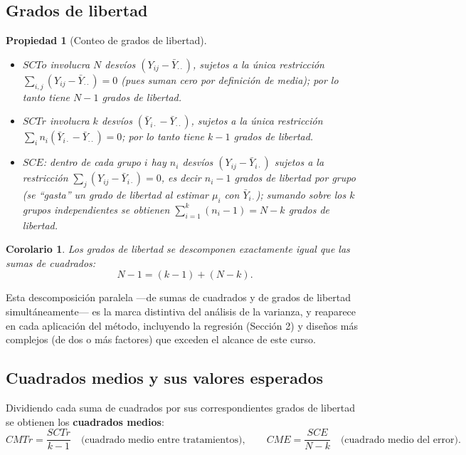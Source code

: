 \documentclass[11pt,a4paper]{article}
\theoremstyle{plain}
\newtheorem{propiedad}[teorema]{Propiedad}
\newtheorem{corolario}[teorema]{Corolario}
\theoremstyle{definition}
\theoremstyle{remark}
\begin{document}
\subsection{Grados de libertad}

\begin{propiedad}[Conteo de grados de libertad]
\begin{itemize}
\item $SCTo$ involucra $N$ desvíos $(Y_{ij}-\bar Y_{\cdot\cdot})$, sujetos a la única restricción $\sum_{i,j}(Y_{ij}-\bar Y_{\cdot\cdot})=0$ (pues suman cero por definición de media); por lo tanto tiene $N-1$ grados de libertad.
\item $SCTr$ involucra $k$ desvíos $(\bar Y_{i\cdot}-\bar Y_{\cdot\cdot})$, sujetos a la única restricción $\sum_in_i(\bar Y_{i\cdot}-\bar Y_{\cdot\cdot})=0$; por lo tanto tiene $k-1$ grados de libertad.
\item $SCE$: dentro de cada grupo $i$ hay $n_i$ desvíos $(Y_{ij}-\bar Y_{i\cdot})$ sujetos a la restricción $\sum_j(Y_{ij}-\bar Y_{i\cdot})=0$, es decir $n_i-1$ grados de libertad por grupo (se ``gasta'' un grado de libertad al estimar $\mu_i$ con $\bar Y_{i\cdot}$); sumando sobre los $k$ grupos independientes se obtienen $\sum_{i=1}^k(n_i-1)=N-k$ grados de libertad.
\end{itemize}
\end{propiedad}

\begin{corolario}
Los grados de libertad se descomponen exactamente igual que las sumas de cuadrados:
\[
N-1 = (k-1)+(N-k).
\]
\end{corolario}

Esta descomposición paralela —de sumas de cuadrados y de grados de libertad simultáneamente— es la marca distintiva del análisis de la varianza, y reaparece en cada aplicación del método, incluyendo la regresión (Sección 2) y diseños más complejos (de dos o más factores) que exceden el alcance de este curso.

\subsection{Cuadrados medios y sus valores esperados}

Dividiendo cada suma de cuadrados por sus correspondientes grados de libertad se obtienen los \textbf{cuadrados medios}:
\[
CMTr = \frac{SCTr}{k-1} \quad \text{(cuadrado medio entre tratamientos)}, \qquad CME = \frac{SCE}{N-k} \quad \text{(cuadrado medio del error)}.
\]
\end{document}
